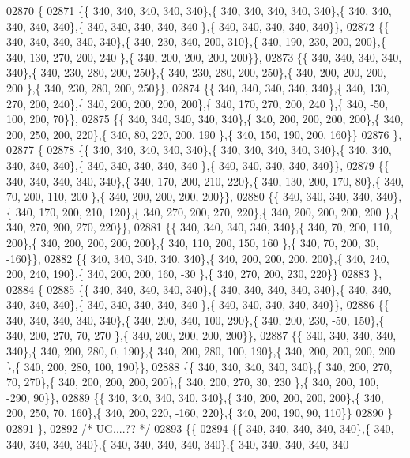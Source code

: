 \begin{DoxyCode}
02870 \{
02871 \{\{ 340, 340, 340, 340, 340\},\{ 340, 340, 340, 340, 340\},\{ 340, 340, 340, 340, 340\},\{ 340, 340, 340, 340, 340
      \},\{ 340, 340, 340, 340, 340\}\},
02872 \{\{ 340, 340, 340, 340, 340\},\{ 340, 230, 340, 200, 310\},\{ 340, 190, 230, 200, 200\},\{ 340, 130, 270, 200, 240
      \},\{ 340, 200, 200, 200, 200\}\},
02873 \{\{ 340, 340, 340, 340, 340\},\{ 340, 230, 280, 200, 250\},\{ 340, 230, 280, 200, 250\},\{ 340, 200, 200, 200, 200
      \},\{ 340, 230, 280, 200, 250\}\},
02874 \{\{ 340, 340, 340, 340, 340\},\{ 340, 130, 270, 200, 240\},\{ 340, 200, 200, 200, 200\},\{ 340, 170, 270, 200, 240
      \},\{ 340, -50, 100, 200,  70\}\},
02875 \{\{ 340, 340, 340, 340, 340\},\{ 340, 200, 200, 200, 200\},\{ 340, 200, 250, 200, 220\},\{ 340,  80, 220, 200, 190
      \},\{ 340, 150, 190, 200, 160\}\}
02876 \},
02877 \{
02878 \{\{ 340, 340, 340, 340, 340\},\{ 340, 340, 340, 340, 340\},\{ 340, 340, 340, 340, 340\},\{ 340, 340, 340, 340, 340
      \},\{ 340, 340, 340, 340, 340\}\},
02879 \{\{ 340, 340, 340, 340, 340\},\{ 340, 170, 200, 210, 220\},\{ 340, 130, 200, 170,  80\},\{ 340,  70, 200, 110, 200
      \},\{ 340, 200, 200, 200, 200\}\},
02880 \{\{ 340, 340, 340, 340, 340\},\{ 340, 170, 200, 210, 120\},\{ 340, 270, 200, 270, 220\},\{ 340, 200, 200, 200, 200
      \},\{ 340, 270, 200, 270, 220\}\},
02881 \{\{ 340, 340, 340, 340, 340\},\{ 340,  70, 200, 110, 200\},\{ 340, 200, 200, 200, 200\},\{ 340, 110, 200, 150, 160
      \},\{ 340,  70, 200,  30, -160\}\},
02882 \{\{ 340, 340, 340, 340, 340\},\{ 340, 200, 200, 200, 200\},\{ 340, 240, 200, 240, 190\},\{ 340, 200, 200, 160, -30
      \},\{ 340, 270, 200, 230, 220\}\}
02883 \},
02884 \{
02885 \{\{ 340, 340, 340, 340, 340\},\{ 340, 340, 340, 340, 340\},\{ 340, 340, 340, 340, 340\},\{ 340, 340, 340, 340, 340
      \},\{ 340, 340, 340, 340, 340\}\},
02886 \{\{ 340, 340, 340, 340, 340\},\{ 340, 200, 340, 100, 290\},\{ 340, 200, 230, -50, 150\},\{ 340, 200, 270,  70, 270
      \},\{ 340, 200, 200, 200, 200\}\},
02887 \{\{ 340, 340, 340, 340, 340\},\{ 340, 200, 280,   0, 190\},\{ 340, 200, 280, 100, 190\},\{ 340, 200, 200, 200, 200
      \},\{ 340, 200, 280, 100, 190\}\},
02888 \{\{ 340, 340, 340, 340, 340\},\{ 340, 200, 270,  70, 270\},\{ 340, 200, 200, 200, 200\},\{ 340, 200, 270,  30, 230
      \},\{ 340, 200, 100, -290,  90\}\},
02889 \{\{ 340, 340, 340, 340, 340\},\{ 340, 200, 200, 200, 200\},\{ 340, 200, 250,  70, 160\},\{ 340, 200, 220, -160, 
      220\},\{ 340, 200, 190,  90, 110\}\}
02890 \}
02891 \},
02892 \textcolor{comment}{/* UG....?? */}
02893 \{\{
02894 \{\{ 340, 340, 340, 340, 340\},\{ 340, 340, 340, 340, 340\},\{ 340, 340, 340, 340, 340\},\{ 340, 340, 340, 340, 340

\end{DoxyCode}
